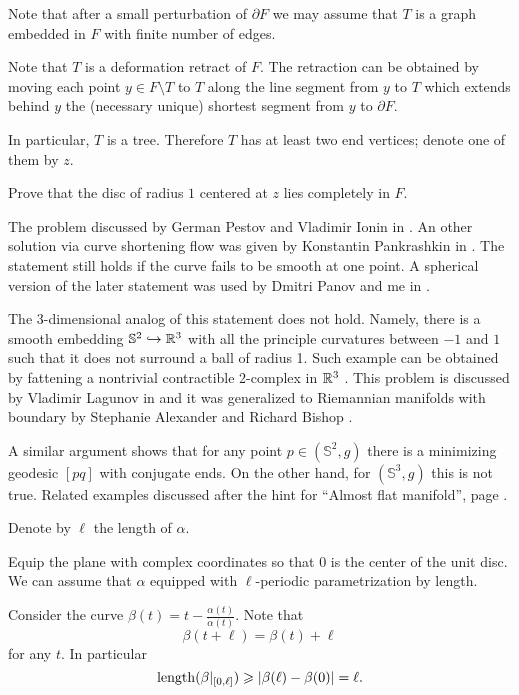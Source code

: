 Note that after a small perturbation
of $\partial F$ we may assume that
$T$ is a graph embedded in
$F$ with finite number of edges.

Note that $T$ is a
deformation retract of $F$.
The retraction can be obtained by moving each point $y\in F\setminus T$ to $T$
along the line segment from $y$ to $T$ 
which extends behind $y$ the (necessary unique) shortest segment from $y$ to $\partial F$.

In particular, $T$ is a tree.
Therefore $T$  has
at least two end vertices;
denote one of them by $z$.

Prove that the disc of radius $1$ centered at $z$ lies completely in $F$.\qeds

The problem discussed by German Pestov and Vla\-di\-mir Ionin in \cite{pestov-ionin}.
An other solution via curve shortening flow 
was given by Konstantin Pankrashkin in  \cite{pankrashkin}.
The statement still holds if the curve fails to be smooth at one point.
A spherical version of the later statement 
was used by Dmitri Panov and me 
in \cite{panov-petrunin-ramification}.

The 3-dimensional analog of this statement does not hold.
Namely, there is a smooth embedding $\mathbb{S}^2\hookrightarrow \mathbb{R}^3$ 
with all the principle curvatures between $-1$ and $1$
such that it does not surround a ball of radius 1.
Such example can be obtained by fattening a nontrivial contractible 2-complex in $\mathbb{R}^3$ 
\cite[the Bing's house constructed in][will do the job]{bing}.
This problem is discussed by Vladimir Lagunov in \cite{lagunov-2} 
and it was generalized to Riemannian manifolds with boundary by Stephanie Alexander and Richard Bishop \cite[see][]{alexander-bishop}.

A similar argument shows that
for any point $p\in (\mathbb S^2,g)$ there is a minimizing geodesic $[pq]$ with conjugate ends.
On the other hand, 
for $(\mathbb S^3,g)$ this is not true.
Related examples discussed after the hint for ``Almost flat manifold'', page \pageref{page-sol:almost-flat}.



 


Denote by $\ell$ the length of $\alpha$.

Equip the plane with complex coordinates so that $0$ is the center of the unit disc.
We can assume that $\alpha$ equipped with $\ell$-periodic parametrization by length.

Consider the curve $\beta(t)=t-\tfrac{\alpha(t)}{\dot\alpha(t)}$.
Note that 
\[\beta(t+\ell)=\beta(t)+\ell\] 
for any $t$.
In particular 
\[\operatorname{\rm length} (\beta|_{[0,\ell]}) 
\geqslant 
|\beta(\ell)-\beta(0)|
=
\ell.\]


